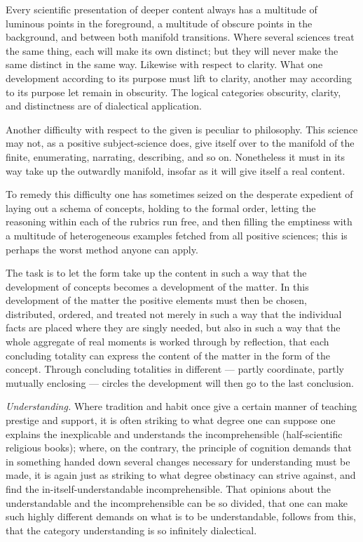 \documentclass[12pt]{book}
\begin{document}
Every scientific presentation of deeper content always has a multitude of luminous points in the
foreground, a multitude of obscure points in the background, and between both manifold transitions.
Where several sciences treat the same thing, each will make its own distinct; but they will never
make the same distinct in the same way. Likewise with respect to clarity. What one development
according to its
purpose must lift to clarity, another may according to its purpose let remain in obscurity. The
logical categories obscurity, clarity, and distinctness are of dialectical application.

Another difficulty with respect to the given is peculiar to philosophy. This science may not, as
a positive subject-science does, give itself over to the manifold of the finite, enumerating,
narrating, describing, and so on. Nonetheless it must in its way take up the outwardly manifold,
insofar as it will give itself a real content.

To remedy this difficulty one has sometimes seized on the desperate expedient of laying out a
schema of concepts, holding to the formal order, letting the reasoning within each of the rubrics
run free, and then filling the emptiness with a multitude of heterogeneous examples fetched from
all positive sciences; this is perhaps the worst method anyone can apply.

The task is to let the form take up the content in such a way that the development of concepts
becomes a development of the matter. In this development of the matter the positive elements must
then be chosen, distributed, ordered, and treated not merely in such a way that the individual
facts are placed where they are singly needed, but also in such a way that the whole aggregate of
real moments is worked through by reflection, that each concluding totality can express the content
of the matter in the form of the concept. Through concluding totalities in different — partly
coordinate, partly mutually enclosing — circles the development will then go to the last conclusion.

\emph{Understanding.} Where tradition and habit once give a certain manner of teaching prestige
and support, it is often striking to what degree one can suppose one explains the inexplicable and
understands the incomprehensible (half-scientific religious books); where, on the contrary, the
principle of cognition demands that in something handed down several changes necessary for
understanding must be made, it is again just
as striking to what degree obstinacy can strive against, and find the in-itself-understandable
incomprehensible. That opinions about the understandable and the incomprehensible can be so divided,
that one can make such highly different demands on what is to be understandable, follows from this,
that the category understanding is so infinitely dialectical.
\end{document}
